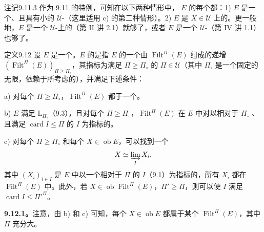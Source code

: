 \begin{SGAresult}{注记}{9.11.3}
作为 9.11 的特例，可知在以下两种情形中， $E$ 的每个都：1) $E$ 是一个、且具有小的 $\mathcal U$-（这里适用 c) 的第二种情形）。2) $E$ 是 $X\in\mathcal U$ 上的。更一般地，$E$ 是一个 $\mathcal U$-上的（第 II 讲 2.1）就够了，或者 $E$ 是一个 $\mathcal U$-（第 IV 讲 1.1）也够了。
\end{SGAresult}

\begin{SGAresult}{定义}{9.12}
设 $E$ 是一个。$E$ 的是指 $E$ 的一个由 $\operatorname{Filt}^\Pi(E)$ 组成的递增 $(\operatorname{Filt}^\Pi(E))_{\Pi\geq\Pi_\circ}$，其指标为满足 $\Pi\geq\Pi_\circ$ 的 $\Pi\in\mathcal U$（其中 $\Pi_\circ$ 是一个固定的无限，依赖于所考虑的），并满足下述条件：

a) 对每个 $\Pi\geq\Pi_\circ$，$\operatorname{Filt}^\Pi(E)$ 都于一个。

b) $E$ 满足 $\mathrm L_{\Pi_\circ}$（9.3），且对每个 $\Pi\geq\Pi_\circ$，$\operatorname{Filt}^\Pi(E)$ 在 $E$ 中对以相对于 $\Pi_\circ$ 、且满足 $\operatorname{card}I\leq\Pi$ 的 $I$ 为指标的。

c) 对每个 $\Pi\geq\Pi_\circ$ 和每个 $X\in\operatorname{ob}E$，可以找到一个
\[
X\simeq\varinjlim_I X_i,
\]
其中 $(X_i)_{i\in I}$ 是 $E$ 中以一个相对于 $\Pi$  的 $I$（9.1）为指标的，所有 $X_i$ 都在 $\operatorname{Filt}^\Pi(E)$ 中。此外，若 $X\in\operatorname{ob}\operatorname{Filt}^\Pi(E)$，$\Pi'\geq\Pi$，则可以使 $I$ 满足 $\operatorname{card}I\leq\Pi'^\Pi$。
\end{SGAresult}

\textbf{9.12.1。}注意，由 b) 和 c) 可知，每个 $X\in\operatorname{ob}E$ 都属于某个 $\operatorname{Filt}^\Pi(E)$，其中 $\Pi$ 充分大。

